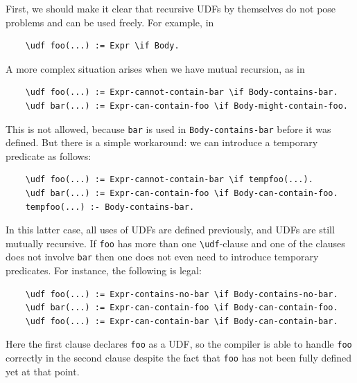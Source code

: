 \documentclass[11pt]{article}
\newcommand{\bs}{\textbackslash}
\begin{document}
First, we should make it clear that recursive UDFs by themselves do not
pose problems and can be used freely.  For example, in
\begin{verbatim}
    \udf foo(...) := Expr \if Body.
\end{verbatim}
A more complex situation arises when we have mutual recursion, as in
\begin{verbatim}
    \udf foo(...) := Expr-cannot-contain-bar \if Body-contains-bar.
    \udf bar(...) := Expr-can-contain-foo \if Body-might-contain-foo.
\end{verbatim}
This is not allowed, because \texttt{bar} is used in
\texttt{Body-contains-bar} before it was defined.
But there is a simple workaround: we can introduce a
temporary predicate as follows:
\begin{verbatim}
    \udf foo(...) := Expr-cannot-contain-bar \if tempfoo(...).
    \udf bar(...) := Expr-can-contain-foo \if Body-can-contain-foo.
    tempfoo(...) :- Body-contains-bar.
\end{verbatim}
In this latter case, all uses of UDFs are defined previously, and UDFs are
still mutually recursive. If \texttt{foo} has more than one
\texttt{\bs{}udf}-clause and one of the clauses does not involve
\texttt{bar} then one does not even need to introduce temporary predicates. For
instance, the following is legal:   
\begin{verbatim}
    \udf foo(...) := Expr-contains-no-bar \if Body-contains-no-bar.
    \udf bar(...) := Expr-can-contain-foo \if Body-can-contain-foo.
    \udf foo(...) := Expr-can-contain-bar \if Body-can-contain-bar.
\end{verbatim}
Here the first clause declares \texttt{foo} as a UDF, so the compiler is
able to handle \texttt{foo} correctly in the second clause despite the fact
that \texttt{foo} has not been fully defined yet at that point. 
\end{document}
